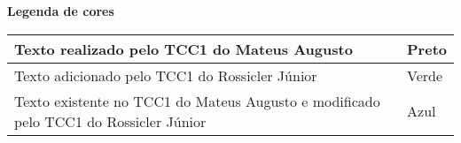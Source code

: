 \newpage
\begin{center}
    \vspace*{1cm}
    \Large \textbf{Legenda de cores}
    
    \begin{table}[htb]
        \centering
        \begin{tabular}{|p{10cm}|p{3cm}|}
        \hline
         Texto realizado pelo TCC1 do Mateus Augusto & Preto \\ \hline
         Texto adicionado pelo TCC1 do Rossicler Júnior  & \textcolor{textadded}{Verde} \\ \hline
         Texto existente no TCC1 do Mateus Augusto e modificado pelo TCC1 do Rossicler Júnior & \textcolor{textmodified}{Azul} \\ \hline
        \end{tabular}
    \end{table}
\end{center}
\newpage
